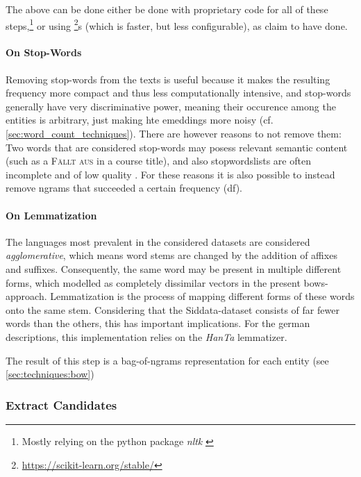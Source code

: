 The above can be done either be done with proprietary code for all of these steps,\footnote{Mostly relying on the python package \emph{nltk} \cite{bird2009natural}} or using \footnote{\url{https://scikit-learn.org/stable/}}s  (which is faster, but less configurable), as \cite{Ager2018} claim to have done.

\paragraph{On Stop-Words}
Removing stop-words from the texts is useful because it makes the resulting frequency more compact and thus less computationally intensive, and stop-words generally have very discriminative power, meaning their occurence among the entities is arbitrary, just making hte emeddings more noisy (cf. \autoref{sec:word_count_techniques}). There are however reasons to not remove them: Two words that are considered stop-words may posess relevant semantic content (such as a \textsc{Fällt aus} in a course title), and also stopwordslists are often incomplete and of low quality \cite{nothman-etal-2018-stop}. For these reasons it is also possible to instead remove \glspl{ngram} that succeeded a certain frequency (\gls{df}).

\paragraph{On Lemmatization}
The languages most prevalent in the considered datasets are considered \textit{agglomerative}, which means word stems are changed by the addition of affixes and suffixes. Consequently, the same word may be present in multiple different forms, which modelled as completely dissimilar vectors in the present \glspl{bow}-approach. Lemmatization is the process of mapping different forms of these words onto the same stem. Considering that the Siddata-dataset consists of far fewer words than the others, this has important implications. For the german descriptions, this implementation relies on the \textit{HanTa} lemmatizer.  %

The result of this step is a bag-of-ngrams representation for each entity (see \autoref{sec:techniques:bow})


\subsubsection{Extract Candidates}
\label{sec:extract_cands}

